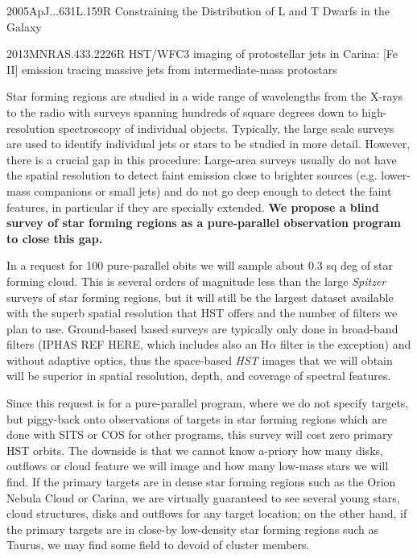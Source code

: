 \documentclass[12pt]{article}
\begin{document}
2005ApJ...631L.159R Constraining the Distribution of L and T Dwarfs in the Galaxy

2013MNRAS.433.2226R HST/WFC3 imaging of protostellar jets in Carina: [Fe II] emission tracing massive jets from intermediate-mass protostars


Star forming regions are studied in a wide range of wavelengths from the X-rays to the radio with surveys spanning hundreds of square degrees down to high-resolution spectroscopy of individual objects. Typically, the large scale surveys are used to identify individual jets or stars to be studied in more detail. However, there is a crucial gap in this procedure: Large-area surveys usually do not have the spatial resolution to detect faint emission close to brighter sources (e.g. lower-mass companions or small jets) and do not go deep enough to detect the faint features, in particular if they are specially extended. \textbf{We propose a blind survey of star forming regions as a pure-parallel observation program to close this gap.}




In a request for 100 pure-parallel obits we will sample about 0.3 sq deg of star forming cloud. This is several orders of magnitude less than the large \emph{Spitzer} surveys of star forming regions, but it will still be the largest dataset available with the superb spatial resolution that HST offers and the number of filters we plan to use. Ground-based based surveys are typically only done in broad-band filters (IPHAS REF HERE, which includes also an H$\alpha$ filter is the exception) and without adaptive optics, thus the space-based \emph{HST} images that we will obtain will be superior in spatial resolution, depth, and coverage of spectral features.

Since this request is for a pure-parallel program, where we do not specify targets, but piggy-back onto observations of targets in star forming regions which are done with SITS or COS for other programs, this survey will cost zero primary HST orbits. The downside is that we cannot know a-priory how many disks, outflows or cloud feature we will image and how many low-mass stars we will find. If the primary targets are in dense star forming regions such as the Orion Nebula Cloud or Carina, we are virtually guaranteed to see several young stars, cloud structures, disks and outflows for any target location; on the other hand, if the primary targets are in close-by low-density star forming regions such as Taurus, we may find some field to devoid of cluster members.
\end{document}
